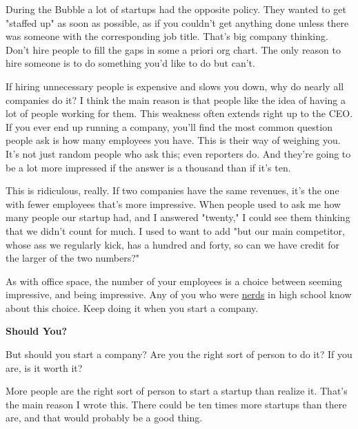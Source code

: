 During the Bubble a lot of startups had
                    the opposite policy. They wanted to get "staffed up" as soon
                    as possible, as if you couldn't get anything done unless
                    there was someone with the corresponding job title. That's
                    big company thinking. Don't hire people to fill the gaps in
                    some a priori org chart. The only reason to hire someone is
                    to do something you'd like to do but can't.

If
                    hiring unnecessary people is expensive and slows you down,
                    why do nearly all companies do it? I think the main reason
                    is that people like the idea of having a lot of people
                    working for them. This weakness often extends right up to
                    the CEO. If you ever end up running a company, you'll find
                    the most common question people ask is how many employees
                    you have. This is their way of weighing you. It's not just
                    random people who ask this; even reporters do. And they're
                    going to be a lot more impressed if the answer is a thousand
                    than if it's ten.

This is ridiculous, really. If
                    two companies have the same revenues, it's the one with
                    fewer employees that's more impressive. When people used to
                    ask me how many people our startup had, and I answered
                    "twenty," I could see them thinking that we didn't count for
                    much. I used to want to add "but our main competitor, whose
                    ass we regularly kick, has a hundred and forty, so can we
                    have credit for the larger of the two numbers?"

As
                    with office space, the number of your employees is a choice
                    between seeming impressive, and being impressive. Any of you
                    who were \href{http://www.paulgraham.com/nerds.html}{nerds} in high school know
                    about this choice. Keep doing it when you start a
                    company.

\textbf{Should You?}

But should
                    you start a company? Are you the right sort of person to do
                    it? If you are, is it worth it?

More people are
                    the right sort of person to start a startup than realize it.
                    That's the main reason I wrote this. There could be ten
                    times more startups than there are, and that would probably
                    be a good thing.

